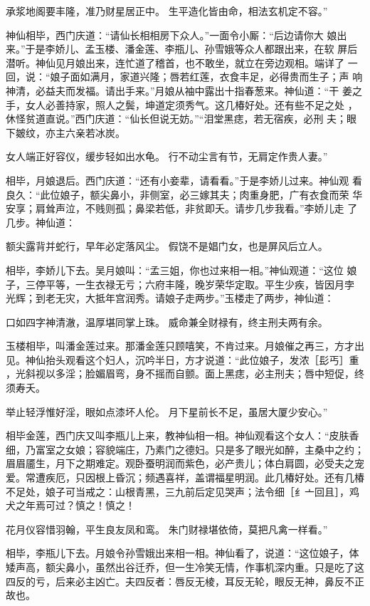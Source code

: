 承浆地阁要丰隆，准乃财星居正中。
生平造化皆由命，相法玄机定不容。”

神仙相毕，西门庆道：“请仙长相相房下众人。”一面令小厮：“后边请你大
娘出来。”于是李娇儿、孟玉楼、潘金莲、李瓶儿、孙雪娥等众人都跟出来，在软
屏后潜听。神仙见月娘出来，连忙道了稽首，也不敢坐，就立在旁边观相。端详了
一回，说：“娘子面如满月，家道兴隆；唇若红莲，衣食丰足，必得贵而生子；声
响神清，必益夫而发福。请出手来。”月娘从袖中露出十指春葱来。神仙道：“干
姜之手，女人必善持家，照人之鬓，坤道定须秀气。这几椿好处。还有些不足之处
，休怪贫道直说。”西门庆道：“仙长但说无妨。”“泪堂黑痣，若无宿疾，必刑
夫；眼下皴纹，亦主六亲若冰炭。

女人端正好容仪，缓步轻如出水龟。
行不动尘言有节，无肩定作贵人妻。”

相毕，月娘退后。西门庆道：“还有小妾辈，请看看。”于是李娇儿过来。神仙观
看良久：“此位娘子，额尖鼻小，非侧室，必三嫁其夫；肉重身肥，广有衣食而荣
华安享；肩耸声泣，不贱则孤；鼻梁若低，非贫即夭。请步几步我看。”李娇儿走
了几步。神仙道：

额尖露背并蛇行，早年必定落风尘。
假饶不是娼门女，也是屏风后立人。

相毕，李娇儿下去。吴月娘叫：“孟三姐，你也过来相一相。”神仙观道：“这位
娘子，三停平等，一生衣禄无亏；六府丰隆，晚岁荣华定取。平生少疾，皆因月孛
光辉；到老无灾，大抵年宫润秀。请娘子走两步。”玉楼走了两步，神仙道：

口如四字神清澈，温厚堪同掌上珠。
威命兼全财禄有，终主刑夫两有余。

玉楼相毕，叫潘金莲过来。那潘金莲只顾嘻笑，不肯过来。月娘催之再三，方才出
见。神仙抬头观看这个妇人，沉吟半日，方才说道：“此位娘子，发浓［髟丐］重
，光斜视以多淫；脸媚眉弯，身不摇而自颤。面上黑痣，必主刑夫；唇中短促，终
须寿夭。

举止轻浮惟好淫，眼如点漆坏人伦。
月下星前长不足，虽居大厦少安心。”

相毕金莲，西门庆又叫李瓶儿上来，教神仙相一相。神仙观看这个女人：“皮肤香
细，乃富室之女娘；容貌端庄，乃素门之德妇。只是多了眼光如醉，主桑中之约；
眉眉靥生，月下之期难定。观卧蚕明润而紫色，必产贵儿；体白肩圆，必受夫之宠
爱。常遭疾厄，只因根上昏沉；频遇喜祥，盖谓福星明润。此几椿好处。还有几椿
不足处，娘子可当戒之：山根青黑，三九前后定见哭声；法令细［纟亠回且］，鸡
犬之年焉可过？慎之！慎之！

花月仪容惜羽翰，平生良友凤和鸾。
朱门财禄堪依倚，莫把凡禽一样看。”

相毕，李瓶儿下去。月娘令孙雪娥出来相一相。神仙看了，说道：“这位娘子，体
矮声高，额尖鼻小，虽然出谷迁乔，但一生冷笑无情，作事机深内重。只是吃了这
四反的亏，后来必主凶亡。夫四反者：唇反无棱，耳反无轮，眼反无神，鼻反不正
故也。

